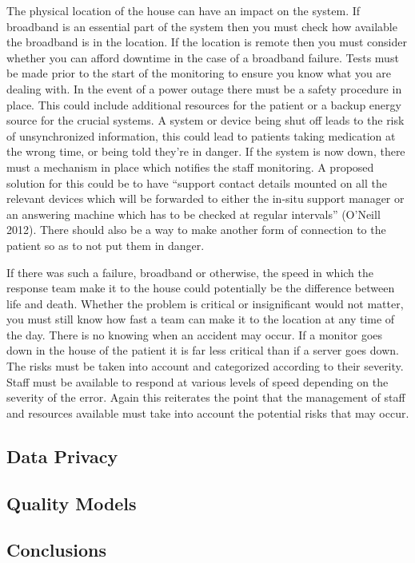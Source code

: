 The physical location of the house can have an impact on the system. If broadband is an essential part of the system then you must check how available the broadband is in the location. If the location is remote then you must consider whether you can afford downtime in the case of a broadband failure. Tests must be made prior to the start of the monitoring to ensure you know what you are dealing with. In the event of a power outage there must be a safety procedure in place. This could include additional resources for the patient or a backup energy source for the crucial systems. A system or device being shut off leads to the risk of unsynchronized information, this could lead to patients taking medication at the wrong time, or being told they’re in danger. If the system is now down, there must a mechanism in place which notifies the staff monitoring. A proposed solution for this could be to have “support contact details mounted on all the relevant devices which will be forwarded to either the in-situ support manager or an answering machine which has to be checked at regular intervals” (O’Neill 2012). There should also be a way to make another form of connection to the patient so as to not put them in danger.

If there was such a failure, broadband or otherwise, the speed in which the response team make it to the house could potentially be the difference between life and death. Whether the problem is critical or insignificant would not matter, you must still know how fast a team can make it to the location at any time of the day. There is no knowing when an accident may occur. If a monitor goes down in the house of the patient it is far less critical than if a server goes down. The risks must be taken into account and categorized according to their severity. Staff must be available to respond at various levels of speed depending on the severity of the error. Again this reiterates the point that the management of staff and resources available must take into account the potential risks that may occur. 

\subsection{Data Privacy}

\subsection{Quality Models}

\subsection{Conclusions}